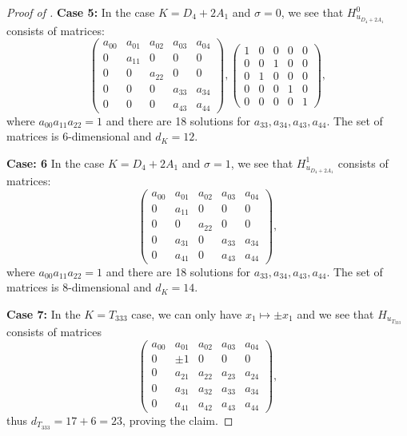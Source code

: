 \documentclass[10pt,a4paper]{amsart}
\begin{document}
\begin{proof}[Proof of ]
\medskip


\noindent\textbf{Case 5:} In the case $K=D_4+2A_1$ and $\sigma=0$, we see that $H_{u_{D_4+2A_1}}^0$ consists of matrices:
$$
\begin{pmatrix}
        a_{00} & a_{01} & a_{02} & a_{03} & a_{04}\\
        0 & a_{11} &      0 &      0 &      0\\
        0 &      0 & a_{22} &      0 &      0\\
        0 &      0 &      0 & a_{33} & a_{34}\\
        0 &      0 &      0 & a_{43} & a_{44}
\end{pmatrix},
\begin{pmatrix}
        1 &      0 &      0 &      0 &      0\\
        0 &      0 &      1 &      0 &      0\\
        0 &      1 &      0 &      0 &      0\\
        0 &      0 &      0 &      1 &      0\\
        0 &      0 &      0 &      0 &      1
\end{pmatrix},
$$
where $a_{00}a_{11}a_{22}=1$ and there are 18 solutions for $a_{33},a_{34},a_{43},a_{44}$.
The set of matrices is $6$-dimensional and $d_K=12$.
\medskip

\noindent \textbf{Case: 6} In the case $K=D_4+2A_1$ and $\sigma=1$, we see that $H_{u_{D_4+2A_1}}^1$ consists of matrices:
$$
\begin{pmatrix}
        a_{00} & a_{01} & a_{02} & a_{03} & a_{04}\\
        0 & a_{11} &      0 &      0 &      0\\
       0 &      0 & a_{22} &      0 &      0\\
       0 & a_{31} &      0 & a_{33} & a_{34}\\
      0 & a_{41} &      0 & a_{43} & a_{44}
\end{pmatrix}, $$
where $a_{00}a_{11}a_{22}=1$ and there are 18 solutions for $a_{33},a_{34},a_{43},a_{44}$. The set of matrices is $8$-dimensional and $d_K=14$. 
    
    \noindent \textbf{Case 7:} In the $K= T_{333}$ case, we can only have $x_1\mapsto \pm x_1$ and we see that $H_{u_{T_{333}}}$ consists of matrices
    $$
    \begin{pmatrix}
        a_{00} & a_{01} & a_{02} & a_{03} & a_{04}\\
             0 &  \pm 1 &      0 &      0 &      0\\
             0 & a_{21} & a_{22} & a_{23} & a_{24}\\
             0 & a_{31} & a_{32} & a_{33} & a_{34}\\
             0 & a_{41} & a_{42} & a_{43} & a_{44}
    \end{pmatrix},
    $$
    thus $d_{T_{333}}=17+6=23$, proving the claim.
\end{proof}
\end{document}

